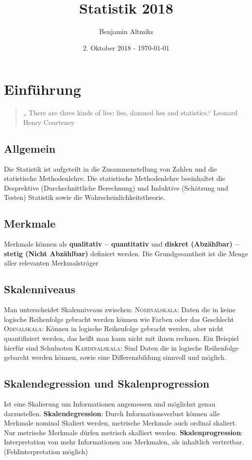 \documentclass[a4paper,10pt]{scrartcl}
\title{Statistik 2018}
\author{Benjamin Altmiks}
\date{2. Oktober 2018 - \today}
\begin{document}
\maketitle
\tableofcontents
\newpage
\section{Einführung}
\begin{quote}
    „ There are three kinds of lies: lies, damned lies and statistics.“ \newline Leonard Henry Courteney
\end{quote}
\subsection{Allgemein}
Die Statistik ist aufgeteilt in die Zusammenstellung von Zahlen und die statistische Methodenlehre. Die statistische Methodenlehre beeinhaltet die Desprektive (Durchschnittliche Berechnung) und Induktive (Schätzung und Testen) Statistik sowie die Wahrscheinlichkeitstheorie.
\subsection{Merkmale}
Merkmale können als \textbf{qualitativ – quantitativ} und \newline \textbf{diskret (Abzählbar) – stetig (Nicht Abzählbar)} definiert werden. \newline
Die Grundgesamtheit ist die Menge aller relevanten Merkmalsträger
\subsection{Skalenniveaus}
Man unterscheidet Skalenniveaus zwischen: \newline\newline
\textsc{Nominalskala}: Daten die in keine logische Reihenfolge gebracht werden können wie Farben oder das Geschlecht
\newline\newline\textsc{Odinalskala}: Können in logische Reihenfolge gebracht werden, aber nicht quantifiziert werden, das heißt man kann nicht mit ihnen rechnen. Ein Beispiel hierfür sind Schulnoten
\newline\newline\textsc{Kardinalskala}: Sind Daten die in logische Reihenfolge gebarcht werden können, sowie eine Differenzbildung sinnvoll und möglich.
\subsection{Skalendegression und Skalenprogression}
Ist eine Skalierung um Informationen angemessen und möglichst genau darzustellen.\newline
\textbf{Skalendegression}: Durch Informationsverlust können alle Merkmale nominal Skaliert werden, metrische Merkmale auch ordinal skaliert. Nur metrische Merkmale dürfen metrisch skalliert werden.\newline
\textbf{Skalenprogression}: Interpretation von mehr Informationen aus Merkmalen, als inhaltlich vertretbar. (Fehlinterpretation möglich) 
\newpage
\end{document}
